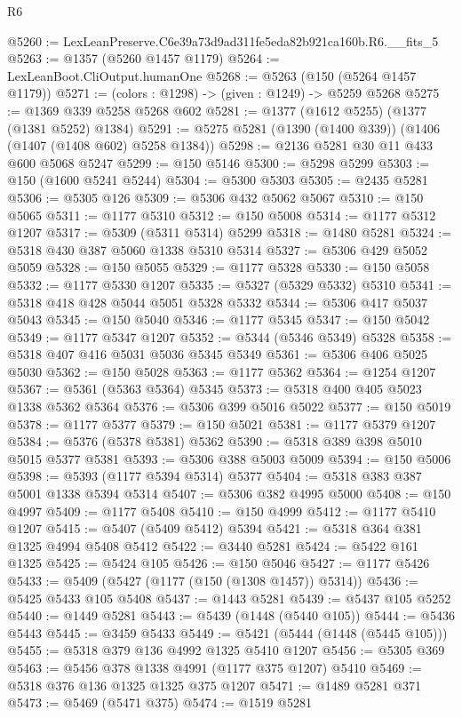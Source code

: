 \begin{lexlean}{R6}
\begin{coremodule}
@5260 := LexLeanPreserve.C6e39a73d9ad311fe5eda82b921ca160b.R6.__fits_5
@5263 := @1357 (@5260 @1457 @1179)
@5264 := LexLeanBoot.CliOutput.humanOne
@5268 := @5263 (@150 (@5264 @1457 @1179))
@5271 := (colors : @1298) -> (given : @1249) -> @5259 @5268
@5275 := @1369 @339 @5258 @5268 @602
@5281 := @1377 (@1612 @5255) (@1377 (@1381 @5252) @1384)
@5291 := @5275 @5281 (@1390 (@1400 @339)) (@1406 (@1407 (@1408 @602) @5258 @1384))
@5298 := @2136 @5281 @30 @11 @433 @600 @5068 @5247
@5299 := @150 @5146
@5300 := @5298 @5299
@5303 := @150 (@1600 @5241 @5244)
@5304 := @5300 @5303
@5305 := @2435 @5281
@5306 := @5305 @126
@5309 := @5306 @432 @5062 @5067
@5310 := @150 @5065
@5311 := @1177 @5310
@5312 := @150 @5008
@5314 := @1177 @5312 @1207
@5317 := @5309 (@5311 @5314) @5299
@5318 := @1480 @5281
@5324 := @5318 @430 @387 @5060 @1338 @5310 @5314
@5327 := @5306 @429 @5052 @5059
@5328 := @150 @5055
@5329 := @1177 @5328
@5330 := @150 @5058
@5332 := @1177 @5330 @1207
@5335 := @5327 (@5329 @5332) @5310
@5341 := @5318 @418 @428 @5044 @5051 @5328 @5332
@5344 := @5306 @417 @5037 @5043
@5345 := @150 @5040
@5346 := @1177 @5345
@5347 := @150 @5042
@5349 := @1177 @5347 @1207
@5352 := @5344 (@5346 @5349) @5328
@5358 := @5318 @407 @416 @5031 @5036 @5345 @5349
@5361 := @5306 @406 @5025 @5030
@5362 := @150 @5028
@5363 := @1177 @5362
@5364 := @1254 @1207
@5367 := @5361 (@5363 @5364) @5345
@5373 := @5318 @400 @405 @5023 @1338 @5362 @5364
@5376 := @5306 @399 @5016 @5022
@5377 := @150 @5019
@5378 := @1177 @5377
@5379 := @150 @5021
@5381 := @1177 @5379 @1207
@5384 := @5376 (@5378 @5381) @5362
@5390 := @5318 @389 @398 @5010 @5015 @5377 @5381
@5393 := @5306 @388 @5003 @5009
@5394 := @150 @5006
@5398 := @5393 (@1177 @5394 @5314) @5377
@5404 := @5318 @383 @387 @5001 @1338 @5394 @5314
@5407 := @5306 @382 @4995 @5000
@5408 := @150 @4997
@5409 := @1177 @5408
@5410 := @150 @4999
@5412 := @1177 @5410 @1207
@5415 := @5407 (@5409 @5412) @5394
@5421 := @5318 @364 @381 @1325 @4994 @5408 @5412
@5422 := @3440 @5281
@5424 := @5422 @161 @1325
@5425 := @5424 @105
@5426 := @150 @5046
@5427 := @1177 @5426
@5433 := @5409 (@5427 (@1177 (@150 (@1308 @1457)) @5314))
@5436 := @5425 @5433 @105 @5408
@5437 := @1443 @5281
@5439 := @5437 @105 @5252
@5440 := @1449 @5281
@5443 := @5439 (@1448 (@5440 @105))
@5444 := @5436 @5443
@5445 := @3459 @5433
@5449 := @5421 (@5444 (@1448 (@5445 @105)))
@5455 := @5318 @379 @136 @4992 @1325 @5410 @1207
@5456 := @5305 @369
@5463 := @5456 @378 @1338 @4991 (@1177 @375 @1207) @5410
@5469 := @5318 @376 @136 @1325 @1325 @375 @1207
@5471 := @1489 @5281 @371
@5473 := @5469 (@5471 @375)
@5474 := @1519 @5281

\end{coremodule}
\end{lexlean}
